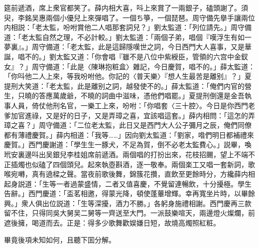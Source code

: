 筵前遞酒，席上衆官都笑了。薛内相大喜，呌上來賞了一兩銀子，磕頭謝了。須臾，李銘吴惠兩個小優兒上來彈唱了。一個ち箏，一個琵琶。周守備先擧手讓兩位内相説：「老太監，吩咐賞他二人唱那套詞兒？」劉太監道：「列位請先。」周守備道：「老太監自然之理，不必計較。」劉太監道：「兩個子弟，唱個『嘆浮生有如一夢裏』。」周守備道：「老太監，此是這歸隱嘆世之詞，今日西門大人喜事，又是華誕，唱不的。」劉太監又道：「你會唱『雖不是八位中紫綬臣，管領的六宫中金釵女』？」周守備道：「此是〈陳琳抱粧盒〉雜記，今日慶賀，唱不的。」薛太監道：「你呌他二人上來，等我吩咐他。你記的〈普天樂〉『想人生最苦是離别』？」夏提刑大笑道：「老太監，此是離别之詞，越發使不的。」薛太監道：「俺們内官的營生，只曉的答應萬歲爺，不曉的詞曲中滋味，憑他們唱罷。」夏提刑倒還是金吾執事人員，倚仗他刑名官，一樂工上來，吩咐：「你唱套〈三十腔〉。今日是你西門老爹加官進祿，又是好的日子，又是弄璋之喜，宜該唱這套。」薛内相問：「這怎的弄璋之喜？」周守備道：「二位老太監，此日又是西門大人公子彌月之辰，俺們同僚都有薄禮慶賀。」薛内相道：「我等……」因向劉太監道：「劉家，喒們明日都補禮來慶賀。」西門慶謝道：「學生生一豚犬，不足為賀，倒不必老太監費心。」説畢，喚玳安裏邊呌出吴銀兒李桂姐席前遞酒。兩個唱的打扮出來，花枝招颺，望上不端不正插燭也似磕了四個頭兒。起來執壺斟酒，逐一敬奉。兩個楽工又唱一套新詞，歌喉宛囀，真有遶樑之聲。當夜前歌後舞，錦簇花攢，直飲至更餘時分，方纔薛内相起身説道：「生等一者過蒙盛情，二者又值喜慶，不覺留連暢飲，十分擾極。學生告辭。」西門慶道：「盃茗相邀，得蒙光降，頓使蓬蓽增輝。幸再寬坐片時，以畢餘興。」衆人俱出位説道：「生等深擾，酒力不勝。」各躬身施禮相謝。西門慶再三款留不住，只得同吳大舅吴二舅等一齊送至大門。一派鼓樂喧天，兩邊燈火燦爛，前遮後擁，喝道而去。正是：得多少歌舞歡娱嫌日短，故燒高燭照紅粧。

畢竟後項未知如何，且聽下囬分解。

